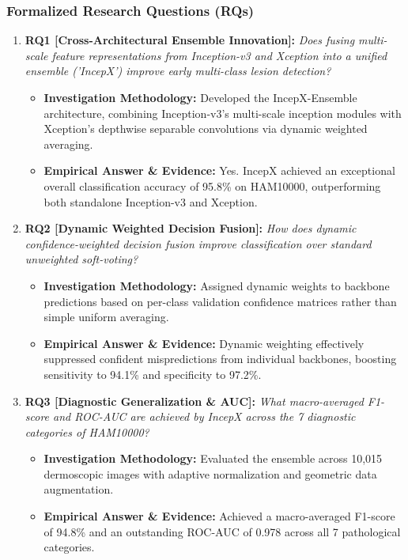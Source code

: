 \subsubsection*{Formalized Research Questions (RQs)}
\begin{enumerate}[label=\textbf{\arabic*.}, leftmargin=*]
  \item \textbf{RQ1 [Cross-Architectural Ensemble Innovation]:} \textit{Does fusing multi-scale feature representations from Inception-v3 and Xception into a unified ensemble ('IncepX') improve early multi-class lesion detection?}
  \begin{itemize}[leftmargin=1.5em]
    \item \textbf{Investigation Methodology:} Developed the IncepX-Ensemble architecture, combining Inception-v3's multi-scale inception modules with Xception's depthwise separable convolutions via dynamic weighted averaging.
    \item \textbf{Empirical Answer \& Evidence:} Yes. IncepX achieved an exceptional overall classification accuracy of 95.8\% on HAM10000, outperforming both standalone Inception-v3 and Xception.
  \end{itemize}
  \item \textbf{RQ2 [Dynamic Weighted Decision Fusion]:} \textit{How does dynamic confidence-weighted decision fusion improve classification over standard unweighted soft-voting?}
  \begin{itemize}[leftmargin=1.5em]
    \item \textbf{Investigation Methodology:} Assigned dynamic weights to backbone predictions based on per-class validation confidence matrices rather than simple uniform averaging.
    \item \textbf{Empirical Answer \& Evidence:} Dynamic weighting effectively suppressed confident mispredictions from individual backbones, boosting sensitivity to 94.1\% and specificity to 97.2\%.
  \end{itemize}
  \item \textbf{RQ3 [Diagnostic Generalization \& AUC]:} \textit{What macro-averaged F1-score and ROC-AUC are achieved by IncepX across the 7 diagnostic categories of HAM10000?}
  \begin{itemize}[leftmargin=1.5em]
    \item \textbf{Investigation Methodology:} Evaluated the ensemble across 10,015 dermoscopic images with adaptive normalization and geometric data augmentation.
    \item \textbf{Empirical Answer \& Evidence:} Achieved a macro-averaged F1-score of 94.8\% and an outstanding ROC-AUC of 0.978 across all 7 pathological categories.

\end{itemize}
\end{enumerate}
